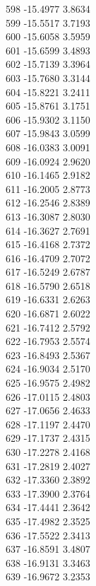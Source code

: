 \documentclass[11pt]{article}
\theoremstyle{definition}
\theoremstyle{plain}
\begin{document}
{598 -15.4977 3.8634\\
599 -15.5517 3.7193\\
600 -15.6058 3.5959\\
601 -15.6599 3.4893\\
602 -15.7139 3.3964\\
603 -15.7680 3.3144\\
604 -15.8221 3.2411\\
605 -15.8761 3.1751\\
606 -15.9302 3.1150\\
607 -15.9843 3.0599\\
608 -16.0383 3.0091\\
609 -16.0924 2.9620\\
610 -16.1465 2.9182\\
611 -16.2005 2.8773\\
612 -16.2546 2.8389\\
613 -16.3087 2.8030\\
614 -16.3627 2.7691\\
615 -16.4168 2.7372\\
616 -16.4709 2.7072\\
617 -16.5249 2.6787\\
618 -16.5790 2.6518\\
619 -16.6331 2.6263\\
620 -16.6871 2.6022\\
621 -16.7412 2.5792\\
622 -16.7953 2.5574\\
623 -16.8493 2.5367\\
624 -16.9034 2.5170\\
625 -16.9575 2.4982\\
626 -17.0115 2.4803\\
627 -17.0656 2.4633\\
628 -17.1197 2.4470\\
629 -17.1737 2.4315\\
630 -17.2278 2.4168\\
631 -17.2819 2.4027\\
632 -17.3360 2.3892\\
633 -17.3900 2.3764\\
634 -17.4441 2.3642\\
635 -17.4982 2.3525\\
636 -17.5522 2.3413\\
637 -16.8591 3.4807\\
638 -16.9131 3.3463\\
639 -16.9672 3.2353\\
}
\end{document}
